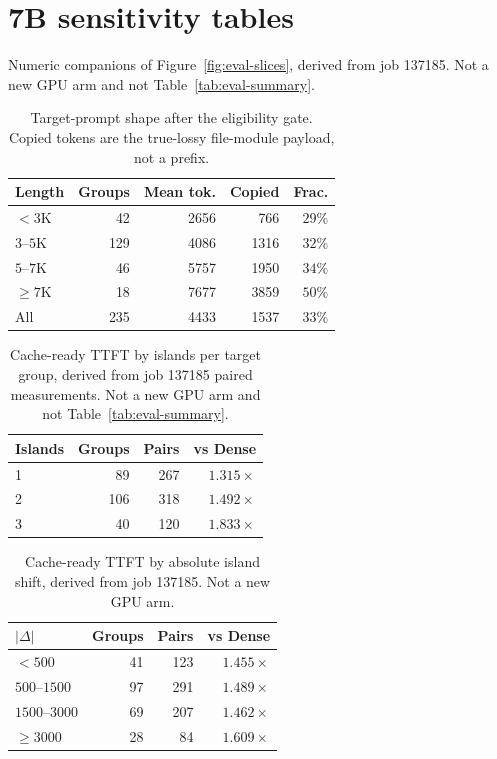 \section{7B sensitivity tables}
\label{app:slices}

Numeric companions of Figure~\ref{fig:eval-slices}, derived from job
137185. Not a new GPU arm and not Table~\ref{tab:eval-summary}.

\begin{table}[t]
\centering
\small
\caption{Target-prompt shape after the eligibility gate. Copied tokens
are the true-lossy file-module payload, not a prefix.}
\label{tab:prompt-shape}
\begin{tabular}{lrrrr}
\toprule
\textbf{Length} & \textbf{Groups} & \textbf{Mean tok.} & \textbf{Copied} & \textbf{Frac.} \\
\midrule
$<3$K & 42 & 2656 & 766 & $29\%$ \\
$3$--$5$K & 129 & 4086 & 1316 & $32\%$ \\
$5$--$7$K & 46 & 5757 & 1950 & $34\%$ \\
$\ge 7$K & 18 & 7677 & 3859 & $50\%$ \\
\midrule
All & 235 & 4433 & 1537 & $33\%$ \\
\bottomrule
\end{tabular}
\end{table}

\begin{table}[t]
\centering
\small
\caption{Cache-ready TTFT by islands per target group, derived from job
137185 paired measurements. Not a new GPU arm and not
Table~\ref{tab:eval-summary}.}
\label{tab:ablate-islands}
\begin{tabular}{lrrr}
\toprule
\textbf{Islands} & \textbf{Groups} & \textbf{Pairs} & \textbf{vs Dense} \\
\midrule
1 & 89 & 267 & $1.315\times$ \\
2 & 106 & 318 & $1.492\times$ \\
3 & 40 & 120 & $1.833\times$ \\
\bottomrule
\end{tabular}
\end{table}

\begin{table}[t]
\centering
\small
\caption{Cache-ready TTFT by absolute island shift, derived from job
137185. Not a new GPU arm.}
\label{tab:ablate-delta}
\begin{tabular}{lrrr}
\toprule
$|\Delta|$ & \textbf{Groups} & \textbf{Pairs} & \textbf{vs Dense} \\
\midrule
$<500$ & 41 & 123 & $1.455\times$ \\
$500$--$1500$ & 97 & 291 & $1.489\times$ \\
$1500$--$3000$ & 69 & 207 & $1.462\times$ \\
$\ge 3000$ & 28 & 84 & $1.609\times$ \\
\bottomrule
\end{tabular}
\end{table}

